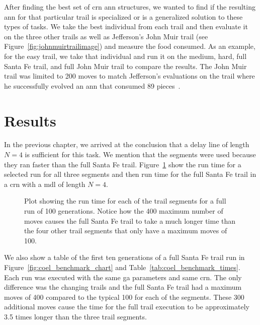 After finding the best set of \gls{crn} \gls{ann} structures, we wanted to find if the resulting \gls{ann} for that particular trail is specialized or is a generalized solution to these types of tasks. We take the best individual from each trail and then evaluate it on the three other trails as well as Jefferson's John Muir trail (see Figure~\ref{fig:johnmuirtrailimage}) and measure the food consumed. As an example, for the easy trail, we take that individual and run it on the medium, hard, full Santa Fe trail, and full John Muir trail to compare the results. The John Muir trail was limited to 200 moves to match Jefferson's evaluations on the trail where he successfully evolved an \gls{ann} that consumed 89 pieces~\cite{Jefferson1992-ph}.

\clearpage
\section{Results}
In the previous chapter, we arrived at the conclusion that a delay line of length $N=4$ is sufficient for this task. We mention that the segments were used because they ran faster than the full Santa Fe trail. Figure~\ref{fig:coel_time_benchmark} show the run time for a selected run for all three segments and then run time for the full Santa Fe trail in a \gls{crn} with a \gls{mdl} of length $N=4$. 

\begin{figure}[hbt]
\centering
{}
\caption[COEL Run Time Benchmark]{Plot showing the run time for each of the trail segments for a full run of 100 generations. Notice how the 400 maximum number of moves causes the full Santa Fe trail to take a much longer time than the four other trail segments that only have a maximum moves of 100.}
\label{fig:coel_time_benchmark}
\end{figure}

We also show a table of the first ten generations of a full Santa Fe trail run in Figure~\ref{fig:coel_benchmark_chart} and Table~\ref{tab:coel_benchmark_times}. Each run was executed with the same \gls{ga} parameters and same \gls{crn}. The only difference was the changing trails and the full Santa Fe trail had a maximum moves of 400 compared to the typical 100 for each of the segments. These 300 additional moves cause the time for the full trail execution to be approximately 3.5 times longer than the three trail segments.

